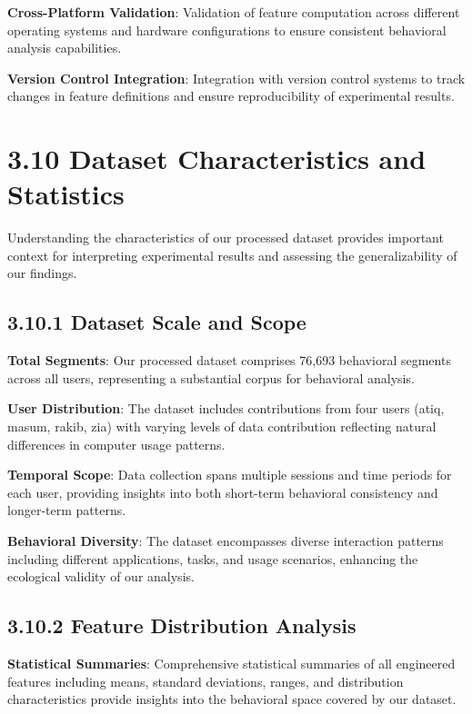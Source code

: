 \documentclass[
  12pt,
  a4paper,
]{report}
\begin{document}
\textbf{Cross-Platform Validation}: Validation of feature computation
across different operating systems and hardware configurations to ensure
consistent behavioral analysis capabilities.

\textbf{Version Control Integration}: Integration with version control
systems to track changes in feature definitions and ensure
reproducibility of experimental results.

\section{3.10 Dataset Characteristics and
Statistics}\label{dataset-characteristics-and-statistics}

Understanding the characteristics of our processed dataset provides
important context for interpreting experimental results and assessing
the generalizability of our findings.

\subsection{3.10.1 Dataset Scale and
Scope}\label{dataset-scale-and-scope}

\textbf{Total Segments}: Our processed dataset comprises 76,693
behavioral segments across all users, representing a substantial corpus
for behavioral analysis.

\textbf{User Distribution}: The dataset includes contributions from four
users (atiq, masum, rakib, zia) with varying levels of data contribution
reflecting natural differences in computer usage patterns.

\textbf{Temporal Scope}: Data collection spans multiple sessions and
time periods for each user, providing insights into both short-term
behavioral consistency and longer-term patterns.

\textbf{Behavioral Diversity}: The dataset encompasses diverse
interaction patterns including different applications, tasks, and usage
scenarios, enhancing the ecological validity of our analysis.

\subsection{3.10.2 Feature Distribution
Analysis}\label{feature-distribution-analysis-1}

\textbf{Statistical Summaries}: Comprehensive statistical summaries of
all engineered features including means, standard deviations, ranges,
and distribution characteristics provide insights into the behavioral
space covered by our dataset.
\end{document}
